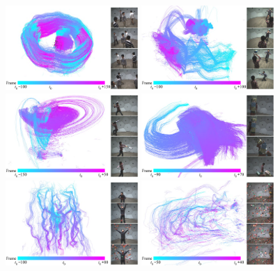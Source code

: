 \begin{figure}[t]
	\centering       
	\includegraphics[width=0.45\textwidth]{figures/circle_small} 
	\includegraphics[width=0.45\textwidth]{figures/volleyBall_small}\\
	\includegraphics[width=0.45\textwidth]{figures/baseball_small}
	\includegraphics[width=0.45\textwidth]{figures/box_small}\\
	\includegraphics[width=0.45\textwidth]{figures/confetti_small}
	\includegraphics[width=0.45\textwidth]{figures/fluid_small}   

\end{figure}
